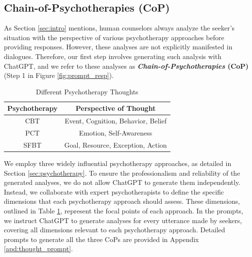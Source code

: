 \subsection{Chain-of-Psychotherapies (CoP)}
\label{sec:cot_generation}
As Section \ref{sec:intro} mentions, human counselors always analyze the seeker's situation with the perspective of various psychotherapy approaches before providing responses. However, these analyses are not explicitly manifested in dialogues. Therefore, our first step involves generating such analysis with ChatGPT, and we refer to these analyses as \textbf{\textit{Chain-of-Psychotherapies} (CoP)} (Step 1 in Figure \ref{fig:prompt_resp}).

\begin{table}[th]
    \small
    \centering
    \begin{tabular}{c|c}
    \toprule
    Psychotherapy & Perspective of Thought  \\ 
    \midrule
    CBT &  Event, Cognition, Behavior, Belief \\
    PCT &  Emotion, Self-Awareness \\
    SFBT & Goal, Resource, Exception, Action \\
    \bottomrule
    \end{tabular}
    \caption{Different Psychotherapy Thoughts}
    \label{tab:psychotherapy_thoughts}
\end{table}

We employ three widely influential psychotherapy approaches, as detailed in Section \ref{sec:psychotherapy}. To ensure the professionalism and reliability of the generated analyses, we do not allow ChatGPT to generate them independently. Instead, we collaborate with expert psychotherapists to define the specific dimensions that each psychotherapy approach should assess. These dimensions, outlined in Table \ref{tab:psychotherapy_thoughts}, represent the focal points of each approach. 
In the prompts, we instruct ChatGPT to generate analyses for every utterance made by seekers, covering all dimensions relevant to each psychotherapy approach. Detailed prompts to generate all the three CoPs are provided in Appendix \ref{apd:thought_prompt}.

